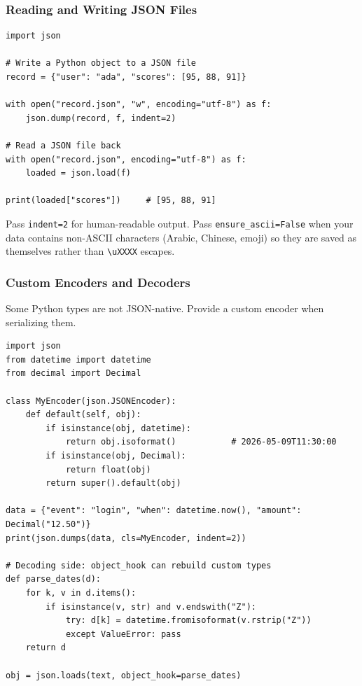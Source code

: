 \documentclass[aspectratio=169,10pt]{beamer}
\newcommand{\codeword}[1]{\texttt{#1}}
\newenvironment{bluebox}[1]{%
  \vspace{0.08cm}\begin{tcolorbox}[lecturebox,title={#1},fontupper=\small]%
}{\end{tcolorbox}\vspace{0.05cm}}
\begin{document}
\begin{frame}[fragile]
\frametitle{Reading and Writing JSON Files}
\small
\begin{lstlisting}[style=pycode]
import json

# Write a Python object to a JSON file
record = {"user": "ada", "scores": [95, 88, 91]}

with open("record.json", "w", encoding="utf-8") as f:
    json.dump(record, f, indent=2)

# Read a JSON file back
with open("record.json", encoding="utf-8") as f:
    loaded = json.load(f)

print(loaded["scores"])     # [95, 88, 91]
\end{lstlisting}

\begin{bluebox}{Encoding and the indent argument}
Pass \codeword{indent=2} for human-readable output. Pass \codeword{ensure\_ascii=False} when your data contains non-ASCII characters (Arabic, Chinese, emoji) so they are saved as themselves rather than \codeword{\textbackslash uXXXX} escapes.
\end{bluebox}
\end{frame}


\begin{frame}[fragile]
\frametitle{Custom Encoders and Decoders}
\small
Some Python types are not JSON-native. Provide a custom encoder when serializing them.

\vspace{0.12cm}
\begin{lstlisting}[style=pycode]
import json
from datetime import datetime
from decimal import Decimal

class MyEncoder(json.JSONEncoder):
    def default(self, obj):
        if isinstance(obj, datetime):
            return obj.isoformat()           # 2026-05-09T11:30:00
        if isinstance(obj, Decimal):
            return float(obj)
        return super().default(obj)

data = {"event": "login", "when": datetime.now(), "amount": Decimal("12.50")}
print(json.dumps(data, cls=MyEncoder, indent=2))

# Decoding side: object_hook can rebuild custom types
def parse_dates(d):
    for k, v in d.items():
        if isinstance(v, str) and v.endswith("Z"):
            try: d[k] = datetime.fromisoformat(v.rstrip("Z"))
            except ValueError: pass
    return d

obj = json.loads(text, object_hook=parse_dates)
\end{lstlisting}
\end{frame}
\end{document}
